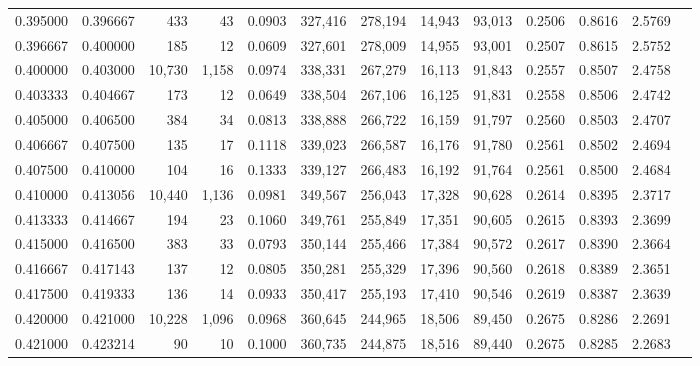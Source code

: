 \begin{tabular}{rrrrrrrrrrrrr}
0.395000 & 0.396667 &    433 &    43 &                                     0.0903 & 327,416 & 278,194 &  14,943 &  93,013 & 0.2506 & 0.8616 & 2.5769 \\
0.396667 & 0.400000 &    185 &    12 &                                     0.0609 & 327,601 & 278,009 &  14,955 &  93,001 & 0.2507 & 0.8615 & 2.5752 \\
0.400000 & 0.403000 & 10,730 & 1,158 &                                     0.0974 & 338,331 & 267,279 &  16,113 &  91,843 & 0.2557 & 0.8507 & 2.4758 \\
0.403333 & 0.404667 &    173 &    12 &                                     0.0649 & 338,504 & 267,106 &  16,125 &  91,831 & 0.2558 & 0.8506 & 2.4742 \\
0.405000 & 0.406500 &    384 &    34 &                                     0.0813 & 338,888 & 266,722 &  16,159 &  91,797 & 0.2560 & 0.8503 & 2.4707 \\
0.406667 & 0.407500 &    135 &    17 &                                     0.1118 & 339,023 & 266,587 &  16,176 &  91,780 & 0.2561 & 0.8502 & 2.4694 \\
0.407500 & 0.410000 &    104 &    16 &                                     0.1333 & 339,127 & 266,483 &  16,192 &  91,764 & 0.2561 & 0.8500 & 2.4684 \\
0.410000 & 0.413056 & 10,440 & 1,136 &                                     0.0981 & 349,567 & 256,043 &  17,328 &  90,628 & 0.2614 & 0.8395 & 2.3717 \\
0.413333 & 0.414667 &    194 &    23 &                                     0.1060 & 349,761 & 255,849 &  17,351 &  90,605 & 0.2615 & 0.8393 & 2.3699 \\
0.415000 & 0.416500 &    383 &    33 &                                     0.0793 & 350,144 & 255,466 &  17,384 &  90,572 & 0.2617 & 0.8390 & 2.3664 \\
0.416667 & 0.417143 &    137 &    12 &                                     0.0805 & 350,281 & 255,329 &  17,396 &  90,560 & 0.2618 & 0.8389 & 2.3651 \\
0.417500 & 0.419333 &    136 &    14 &                                     0.0933 & 350,417 & 255,193 &  17,410 &  90,546 & 0.2619 & 0.8387 & 2.3639 \\
0.420000 & 0.421000 & 10,228 & 1,096 &                                     0.0968 & 360,645 & 244,965 &  18,506 &  89,450 & 0.2675 & 0.8286 & 2.2691 \\
0.421000 & 0.423214 &     90 &    10 &                                     0.1000 & 360,735 & 244,875 &  18,516 &  89,440 & 0.2675 & 0.8285 & 2.2683 \\

\end{tabular}
